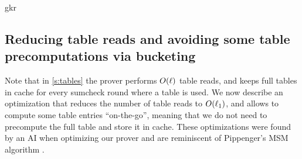 \begin{lncsappendix}{gkr}

\subsection{Reducing table reads and avoiding some table precomputations via bucketing}\label{s:gkr_buckets}

Note that in \cref{s:tables} the prover performs $O(\ell)$ table reads, and keeps  full tables in cache for every sumcheck round where  a table is used. We now describe an optimization that reduces the  number of table reads to $O(\ell_1)$, and  allows to compute some table entries ``on-the-go'', meaning that we do not need to precompute the full table and store it in cache.  These optimizations were found by an AI when optimizing our prover and are reminiscent of Pippenger's MSM algorithm \cite{pipp}.



\end{lncsappendix}
